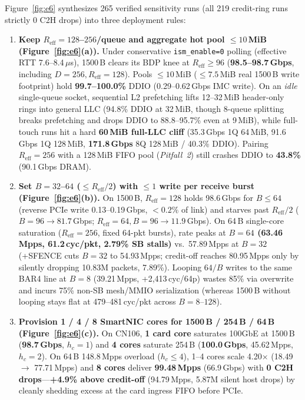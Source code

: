 Figure~\ref{fig:e6} synthesizes 265 verified sensitivity runs (all 219
credit-ring runs strictly 0 C2H drops) into three deployment rules:
\begin{enumerate}
\item \textbf{Keep $R_{\text{eff}}=128$--$256$/queue and aggregate hot pool $\le 10$\,MiB
  (Figure~\ref{fig:e6}(a)).} Under conservative \texttt{ism\_enable=0} polling
  (effective RTT 7.6--8.4\,$\mu$s), 1500\,B clears its BDP knee at
  $R_{\text{eff}} \ge 96$ (\textbf{98.5--98.7\,Gbps}, including $D=256,
  R_{\text{eff}}=128$). Pools $\le 10$\,MiB ($\le 7.5$\,MiB real 1500\,B write
  footprint) hold \textbf{99.7--100.0\%} DDIO (0.29--0.62\,Gbps IMC write). On
  an \emph{idle} single-queue socket, sequential L2 prefetching lifts 12--32\,MiB
  header-only rings into general LLC (94.8\% DDIO at 32\,MiB, though 8-queue
  splitting breaks prefetching and drops DDIO to 88.8--95.7\% even at 9\,MiB),
  while full-touch runs hit a hard \textbf{60\,MiB full-LLC cliff} (35.3\,Gbps
  1Q 64\,MiB, 91.6\,Gbps 1Q 128\,MiB, \textbf{171.8\,Gbps} 8Q 128\,MiB / 40.3\%
  DDIO). Pairing $R_{\text{eff}}=256$ with a 128\,MiB FIFO pool (\emph{Pitfall~2})
  still crashes DDIO to \textbf{43.8\%} (90.1\,Gbps DRAM).
\item \textbf{Set $B=32$--$64$ ($\le R_{\text{eff}}/2$) with $\le 1$ write per
  receive burst (Figure~\ref{fig:e6}(b)).} On 1500\,B, $R_{\text{eff}}=128$
  holds 98.6\,Gbps for $B \le 64$ (reverse PCIe write 0.13--0.19\,Gbps,
  $<0.2\%$ of link) and starves past $R_{\text{eff}}/2$ ($B=96 \to 81.7$\,Gbps;
  $R_{\text{eff}}=64, B=96 \to 11.9$\,Gbps). On 64\,B single-core saturation
  ($R_{\text{eff}}=256$, fixed 64-pkt bursts), rate peaks at \textbf{$B=64$
  (63.46\,Mpps, 61.2\,cyc/pkt, 2.79\% SB stalls)} vs.\ 57.89\,Mpps at $B=32$
  (+SFENCE cuts $B=32$ to 54.93\,Mpps; credit-off reaches 80.95\,Mpps only by
  silently dropping 10.83M packets, 7.89\%). Looping $64/B$ writes to the same
  BAR4 line at $B=8$ (39.21\,Mpps, +2,413\,cyc/64p) wastes 85\% via overwrite
  and incurs 75\% non-SB mesh/MMIO serialization (whereas 1500\,B without
  looping stays flat at 479--481\,cyc/pkt across $B=8$--$128$).
\item \textbf{Provision 1 / 4 / 8 SmartNIC cores for 1500\,B / 254\,B / 64\,B
  (Figure~\ref{fig:e6}(c)).} On CN106, \textbf{1 card core} saturates 100GbE at
  1500\,B (\textbf{98.7\,Gbps}, $h_c=1$) and \textbf{4 cores} saturate 254\,B
  (\textbf{100.0\,Gbps}, 45.62\,Mpps, $h_c=2$). On 64\,B 148.8\,Mpps overload
  ($h_c \le 4$), 1--4 cores scale 4.20$\times$ (18.49 $\to$ 77.71\,Mpps) and
  \textbf{8 cores} deliver \textbf{99.48\,Mpps} (66.9\,Gbps) with \textbf{0 C2H
  drops}---\textbf{+4.9\% above credit-off} (94.79\,Mpps, 5.87M silent host
  drops) by cleanly shedding excess at the card ingress FIFO before PCIe.
\end{enumerate}
